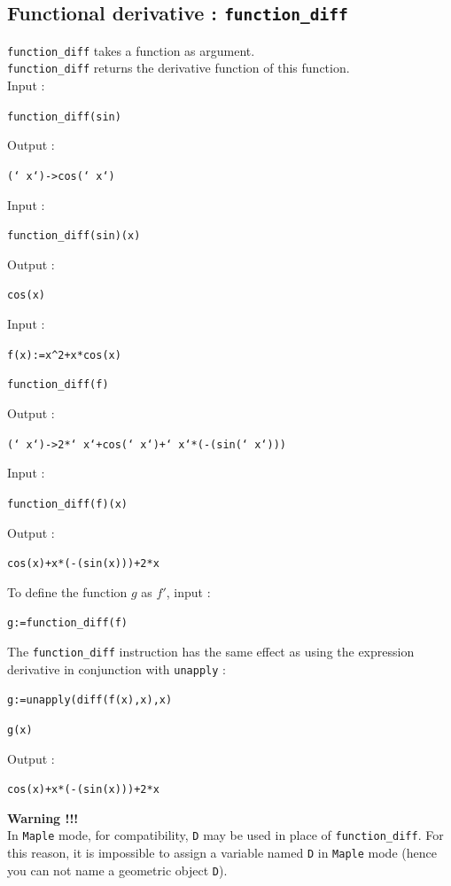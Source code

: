 \documentclass[a4paper,11pt]{book}
\begin{document}
\subsection{Functional derivative  : {\tt function\_diff}}
{\tt function\_diff} takes a function as argument.\\
{\tt function\_diff} returns the derivative function of this function.\\
Input :
\begin{center}{\tt function\_diff(sin)}\end{center}
Output :
\begin{center}{\tt (` x`)->cos(` x`)}\end{center}  
Input :
\begin{center}{\tt function\_diff(sin)(x)}\end{center}
Output :
\begin{center}{\tt cos(x)}\end{center}  
Input :
\begin{center}{\tt f(x):=x\verb|^|2+x*cos(x)}\end{center} 
\begin{center}{\tt function\_diff(f)}\end{center}
Output :
\begin{center}{\tt  (` x`)->2*` x`+cos(` x`)+` x`*(-(sin(` x`)))}\end{center}  
Input :
\begin{center}{\tt function\_diff(f)(x)}\end{center}
Output :
\begin{center}{\tt  cos(x)+x*(-(sin(x)))+2*x}\end{center}  
To define the function $g$ as $f'$, input :\\
\begin{center}{\tt g:=function\_diff(f)}\end{center}
The {\tt function\_diff} instruction has the same effect as
using the expression derivative in conjunction with {\tt unapply} :
\begin{center}{\tt g:=unapply(diff(f(x),x),x)}\end{center}
\begin{center}{\tt g(x)}\end{center} 
Output :
\begin{center}{\tt  cos(x)+x*(-(sin(x)))+2*x}\end{center}  
{\bf Warning !!!}\\
In {\tt Maple} mode, for compatibility,
{\tt D} may be used in place of {\tt function\_diff}.
For this reason, it is impossible to assign a variable named 
{\tt D} in {\tt Maple} mode (hence you can not name a 
geometric object {\tt D}).
\end{document}
